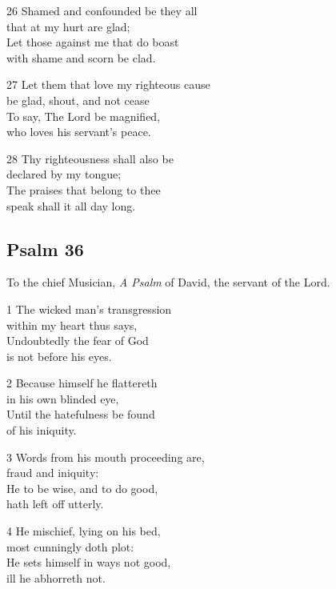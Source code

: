 \begin{multicols}{3}
26 Shamed and confounded be they all\\
that at my hurt are glad;\\
Let those against me that do boast\\
with shame and scorn be clad.

27 Let them that love my righteous cause\\
be glad, shout, and not cease\\
To say, The Lord be magnified,\\
who loves his servant’s peace.

28 Thy righteousness shall also be\\
declared by my tongue;\\
The praises that belong to thee\\
speak shall it all day long.

\begin{center}
\quad{}\quad{}
\end{center}

\subsection*{Psalm 36 }

To the chief Musician,
\emph{A Psalm} of David, the servant of the Lord.

1 The wicked man’s transgression\\
within my heart thus says,\\
Undoubtedly the fear of God\\
is not before his eyes.

2 Because himself he flattereth\\
in his own blinded eye,\\
Until the hatefulness be found\\
of his iniquity.

3 Words from his mouth proceeding are,\\
fraud and iniquity:\\
He to be wise, and to do good,\\
hath left off utterly.

4 He mischief, lying on his bed,\\
most cunningly doth plot:\\
He sets himself in ways not good,\\
ill he abhorreth not.


\end{multicols}
